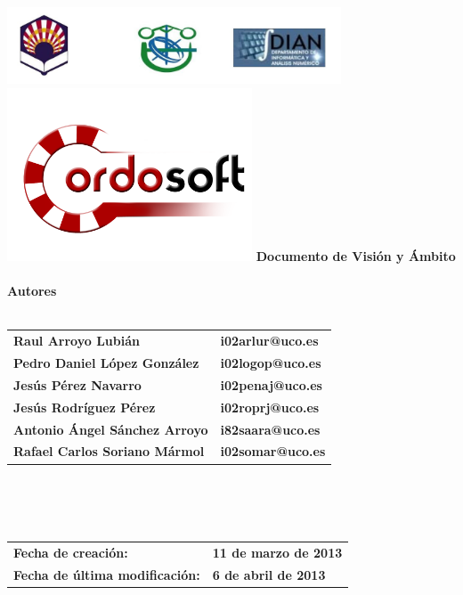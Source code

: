 \documentclass[a4paper,11pt]{article}
\begin{document}
	\begin{titlepage}
		\begin{center}
			\includegraphics[width=375px]{Universidad.png} 
            \includegraphics[width=275px]{logo_cordosoft.png} 
			\textbf{\LARGE Documento de Visión y Ámbito}
			\\
			\textbf{}
			\\
			\textbf{Autores}
			\\
			\textbf{}
			\\
			\begin{tabular}{l l}
				\textbf{Raul Arroyo Lubián} & \textbf{i02arlur@uco.es} \\	
				\textbf{Pedro Daniel López González} & \textbf{i02logop@uco.es} \\
				\textbf{Jesús Pérez Navarro} & \textbf{i02penaj@uco.es} \\
				\textbf{Jesús Rodríguez Pérez} & \textbf{i02roprj@uco.es} \\
				\textbf{Antonio Ángel Sánchez Arroyo} & \textbf{i82saara@uco.es} \\
				\textbf{Rafael Carlos Soriano Mármol} & \textbf{i02somar@uco.es} \\
			\end{tabular}
			\\
			\textbf{}
			\\
			\textbf{}
			\\
			\begin{tabular}{l l}
				\textbf{Fecha de creación:} & \textbf{11 de marzo de 2013} \\
				\textbf{Fecha de última modificación:} & \textbf{6 de abril de 2013} \\
			\end{tabular}
		\end{center}
    \end{titlepage}
\end{document}

